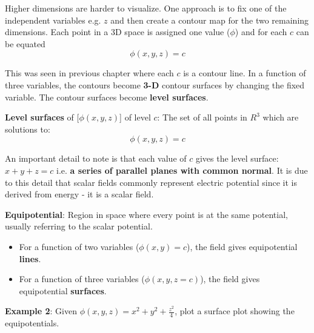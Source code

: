 \documentclass[10pt,a4paper]{article}
\begin{document}
Higher dimensions are harder to visualize. One approach is to fix one of the independent variables
e.g. $z$ and then create a contour map for the two remaining dimensions. Each point in a 3D space is
assigned one value ($\phi$) and for each $c$ can be equated $$\phi(x,y,z)=c$$ 

This was seen in previous chapter where each $c$ is a contour line. In a function of three
variables, the contours become \textbf{3-D} contour surfaces by changing the fixed variable. The
contour surfaces become \textbf{level surfaces}.

\begin{tcolorbox}[breakable,colback=white]
    \textbf{Level surfaces} of [$\phi(x,y,z)$] of level $c$: The set of all points in $R^3$ which
    are solutions to:
    $$
        \phi(x,y,z)=c
    $$
\end{tcolorbox}

An important detail to note is that each value of $c$ gives the level surface: $x+y+z=c$ i.e.
\textbf{a series of parallel planes with common normal}. It is due to this detail that scalar fields
commonly represent electric potential since it is derived from energy - it is a scalar field. \par 

\begin{tcolorbox}[breakable,colback=white]
\textbf{Equipotential}: Region in space where every point is at the same potential, usually
referring to the scalar potential.
\end{tcolorbox}
\begin{itemize}
    \item For a function of two variables ($\phi(x,y)=c$), the field gives equipotential \textbf{lines}.
    \item For a function of three variables ($\phi(x,y,z=c)$), the field gives equipotential \textbf{surfaces}.
\end{itemize}

\textbf{Example 2}: Given $\phi(x,y,z)=x^2+y^2+\frac{z^2}{4}$, plot a surface plot showing the
equipotentials. \par 
\end{document}
